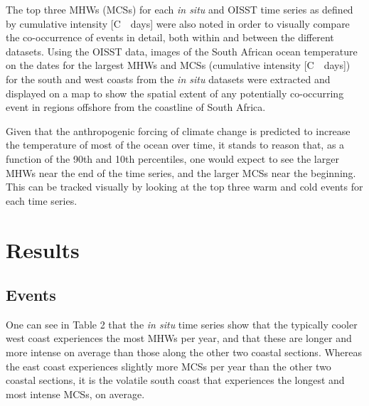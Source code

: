 \documentclass[a4paper,10pt,review]{elsarticle}
\begin{document}
The top three MHWs (MCSs) for each \emph{in situ} and OISST time series as defined by cumulative intensity [\degree C~\texttimes~days] were also noted in order to visually compare the co-occurrence of events in detail, both within and between the different datasets. Using the OISST data, images of the South African ocean temperature on the dates for the largest MHWs and MCSs (cumulative intensity [\degree C~\texttimes~days]) for the south and west coasts from the \emph{in situ} datasets were extracted and displayed on a map to show the spatial extent of any potentially co-occurring event in regions offshore from the coastline of South Africa.

Given that the anthropogenic forcing of climate change is predicted to increase the temperature of most of the ocean over time, it stands to reason that, as a function of the 90th and 10th percentiles, one would expect to see the larger MHWs near the end of the time series, and the larger MCSs near the beginning.  This can be tracked visually by looking at the top three warm and cold events for each time series.

\section{Results}

\subsection{Events}
One can see in Table 2 that the \emph{in situ} time series show that the typically cooler west coast experiences the most MHWs per year, and that these are longer and more intense on average than those along the other two coastal sections. Whereas the east coast experiences slightly more MCSs per year than the other two coastal sections, it is the volatile south coast that experiences the longest and most intense MCSs, on average.
\end{document}

